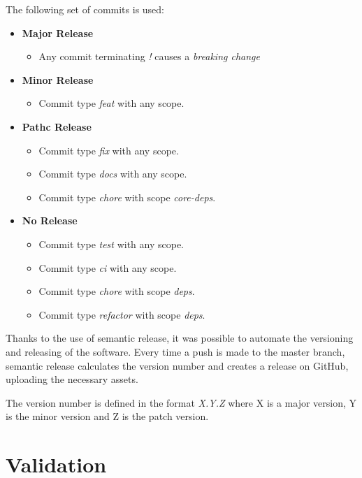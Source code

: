 \documentclass[12pt,a4paper,openright,twoside]{book}
\begin{document}
The following set of commits is used:
\begin{itemize}
  \item \textbf{Major Release} 
  \begin{itemize}
    \item Any commit terminating \textit{!} causes a \emph{breaking change}
  \end{itemize}

  \item \textbf{Minor Release} 
  \begin{itemize}
    \item Commit type \emph{feat} with any scope.
  \end{itemize}

  \item \textbf{Pathc Release} 
  \begin{itemize}
    \item Commit type \emph{fix} with any scope.
    \item Commit type \emph{docs} with any scope.
    \item Commit type \emph{chore} with scope \textit{core-deps}.
  \end{itemize}

  \item \textbf{No Release} 
  \begin{itemize}
    \item Commit type \emph{test} with any scope.
    \item Commit type \emph{ci} with any scope.
    \item Commit type \emph{chore} with scope \textit{deps}.
    \item Commit type \emph{refactor} with scope \textit{deps}.
  \end{itemize}
\end{itemize}

Thanks to the use of semantic release, it was possible to automate the versioning and releasing of the software. 
Every time a push is made to the master branch, semantic release calculates the version number and creates a release on GitHub, uploading the necessary assets.

The version number is defined in the format \emph{X.Y.Z} where X is a major version, Y is the minor version and Z is the patch version.

\chapter{Validation}
\end{document}
